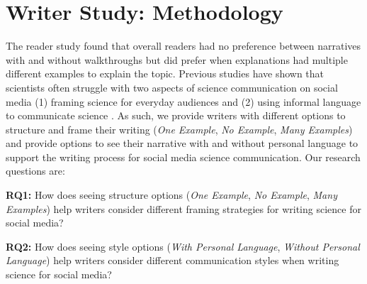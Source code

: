 \section{Writer Study: Methodology}


The reader study found that overall readers had no preference between narratives with and without walkthroughs but did prefer when explanations had multiple different examples to explain the topic. Previous studies have shown that scientists often struggle with two aspects of science communication on social media (1) framing science for everyday audiences and (2) using informal language to communicate science \cite{williams2022hci, koivumaki2020social}. As such, we provide writers with different options to structure and frame their writing (\textit{One Example}, \textit{No Example}, \textit{Many Examples}) and provide options to see their narrative with and without personal language to support the writing process for social media science communication. Our research questions are:

\textbf{RQ1:} How does seeing structure options (\textit{One Example}, \textit{No Example}, \textit{Many Examples}) help writers consider different framing strategies for writing science for social media?

\textbf{RQ2:} How does seeing style options (\textit{With Personal Language}, \textit{Without Personal Language}) help writers consider different communication styles when writing science for social media?





